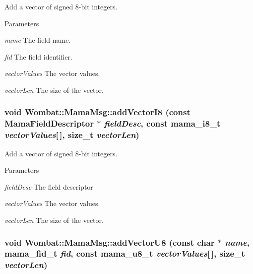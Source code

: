 Add a vector of signed 8-\/bit integers. 
\begin{DoxyParams}{Parameters}
\item[{\em name}]The field name. \item[{\em fid}]The field identifier. \item[{\em vectorValues}]The vector values. \item[{\em vectorLen}]The size of the vector. \end{DoxyParams}
\hypertarget{classWombat_1_1MamaMsg_a1e3b26329173690051056e764ae932bb}{
\subsubsection[{addVectorI8}]{\setlength{\rightskip}{0pt plus 5cm}void Wombat::MamaMsg::addVectorI8 (const {\bf MamaFieldDescriptor} $\ast$ {\em fieldDesc}, \/  const mama\_\-i8\_\-t {\em vectorValues}\mbox{[}$\,$\mbox{]}, \/  size\_\-t {\em vectorLen})}}
\label{classWombat_1_1MamaMsg_a1e3b26329173690051056e764ae932bb}


Add a vector of signed 8-\/bit integers. 
\begin{DoxyParams}{Parameters}
\item[{\em fieldDesc}]The field descriptor \item[{\em vectorValues}]The vector values. \item[{\em vectorLen}]The size of the vector. \end{DoxyParams}
\hypertarget{classWombat_1_1MamaMsg_acce4beb22b3aa29ad2de80fdd03f9a84}{
\subsubsection[{addVectorU8}]{\setlength{\rightskip}{0pt plus 5cm}void Wombat::MamaMsg::addVectorU8 (const char $\ast$ {\em name}, \/  mama\_\-fid\_\-t {\em fid}, \/  const mama\_\-u8\_\-t {\em vectorValues}\mbox{[}$\,$\mbox{]}, \/  size\_\-t {\em vectorLen})}}
\label{classWombat_1_1MamaMsg_acce4beb22b3aa29ad2de80fdd03f9a84}


